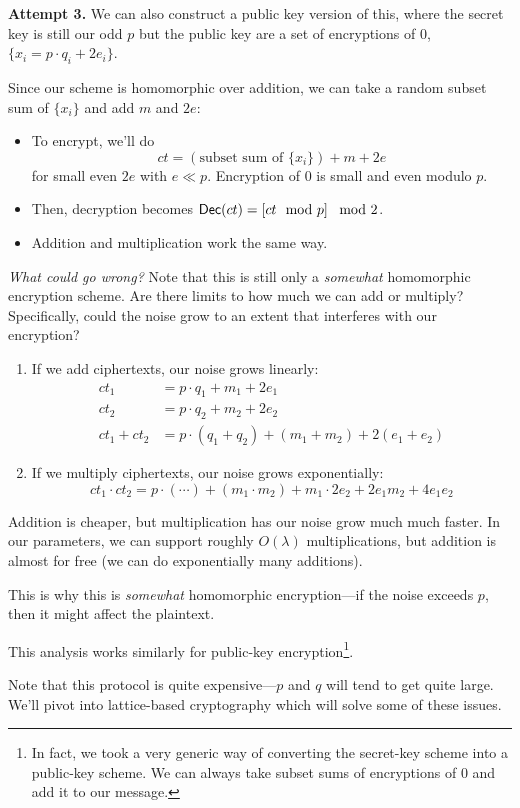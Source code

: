 \textbf{Attempt 3.} We can also construct a public key version of this, where the secret key is still our odd $p$ but the public key are a set of encryptions of $0$, $\{x_i = p\cdot q_i + 2e_i\}$.

Since our scheme is homomorphic over addition, we can take a random subset sum of $\{x_i\}$ and add $m$ and $2e$:
\begin{itemize}
    \item To encrypt, we'll do
          \[ct = (\text{subset sum of $\{x_i\}$}) + m + 2e\]
          for small even $2e$ with $e \ll p$. Encryption of $0$ is small and even modulo $p$.
    \item Then, decryption becomes $\operatorname{\mathsf{Dec}}(ct) = \left[ ct\mod p \right]\mod 2$.
    \item Addition and multiplication work the same way.
\end{itemize}

\emph{What could go wrong?} Note that this is still only a \emph{somewhat} homomorphic encryption scheme. Are there limits to how much we can add or multiply? Specifically, could the noise grow to an extent that interferes with our encryption?
\begin{enumerate}
    \item If we add ciphertexts, our noise grows linearly:
          \begin{align*}
              ct_1        & = p\cdot q_1 + m_1 + 2e_1                         \\
              ct_2        & = p\cdot q_2 + m_2 + 2e_2                         \\
              ct_1 + ct_2 & = p\cdot (q_1 + q_2) + (m_1 + m_2) + 2(e_1 + e_2)
          \end{align*}
    \item If we multiply ciphertexts, our noise grows exponentially:
          \[ct_1 \cdot ct_2 = p\cdot (\cdots) + (m_1 \cdot m_2) + m_1\cdot 2e_2 + 2e_1m_2 + 4e_1e_2\]
\end{enumerate}
Addition is cheaper, but multiplication has our noise grow much much faster. In our parameters, we can support roughly $O(\lambda)$ multiplications, but addition is almost for free (we can do exponentially many additions).

This is why this is \emph{somewhat} homomorphic encryption---if the noise exceeds $p$, then it might affect the plaintext.

This analysis works similarly for public-key encryption\footnote{In fact, we took a very generic way of converting the secret-key scheme into a public-key scheme. We can always take subset sums of encryptions of $0$ and add it to our message.}.

Note that this protocol is quite expensive---$p$ and $q$ will tend to get quite large. We'll pivot into lattice-based cryptography which will solve some of these issues.
